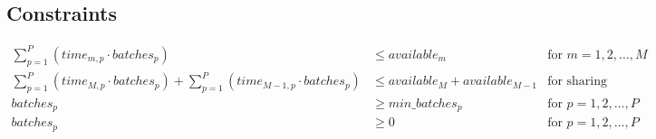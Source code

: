 \documentclass{article}
\begin{document}
\subsection*{Constraints}
\begin{align*}
    \sum_{p=1}^{P} (time_{m,p} \cdot batches_{p}) & \leq available_{m} & \text{for } m = 1, 2, \ldots, M \\
    \sum_{p=1}^{P} (time_{M,p} \cdot batches_{p}) + \sum_{p=1}^{P} (time_{M-1,p} \cdot batches_{p}) & \leq available_{M} + available_{M-1} & \text{for sharing machines M and M-1} \\
    batches_{p} & \geq min\_batches_{p} & \text{for } p = 1, 2, \ldots, P \\
    batches_{p} & \geq 0 & \text{for } p = 1, 2, \ldots, P \\
\end{align*}
\end{document}
